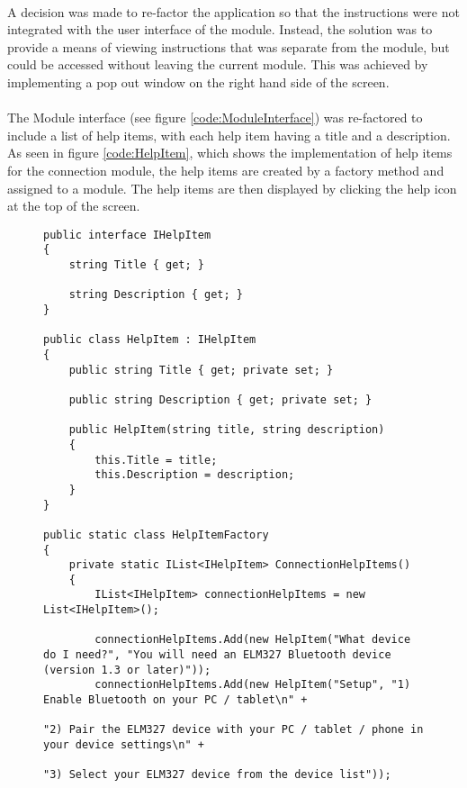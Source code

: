 {		\paragraph{}{
		A decision was made to re-factor the application so that the instructions were not integrated with the user interface of the module. Instead, the solution was to provide a means of viewing instructions that was separate from the module, but could be accessed without leaving the current module. This was achieved by implementing a pop out window on the right hand side of the screen.
		}
		\paragraph{}{
		The Module interface (see figure \ref{code:ModuleInterface}) was re-factored to include a list of help items, with each help item having a title and a description. As seen in figure \ref{code:HelpItem}, which shows the implementation of help items for the connection module, the help items are created by a factory method and assigned to a module. The help items are then displayed by clicking the help icon at the top of the screen.
		}
		
		\begin{figure}[h]
			\begin{lstlisting}
public interface IHelpItem
{
    string Title { get; }

	string Description { get; }
}

public class HelpItem : IHelpItem
{
	public string Title { get; private set; }

	public string Description { get; private set; }

	public HelpItem(string title, string description)
	{
		this.Title = title;
		this.Description = description;
	}
}

public static class HelpItemFactory
{
	private static IList<IHelpItem> ConnectionHelpItems()
	{
    	IList<IHelpItem> connectionHelpItems = new List<IHelpItem>();

		connectionHelpItems.Add(new HelpItem("What device do I need?", "You will need an ELM327 Bluetooth device (version 1.3 or later)"));
        connectionHelpItems.Add(new HelpItem("Setup", "1) Enable Bluetooth on your PC / tablet\n" +
                                                          "2) Pair the ELM327 device with your PC / tablet / phone in your device settings\n" +
                                                          "3) Select your ELM327 device from the device list"));


\end{lstlisting}
\end{figure}}
